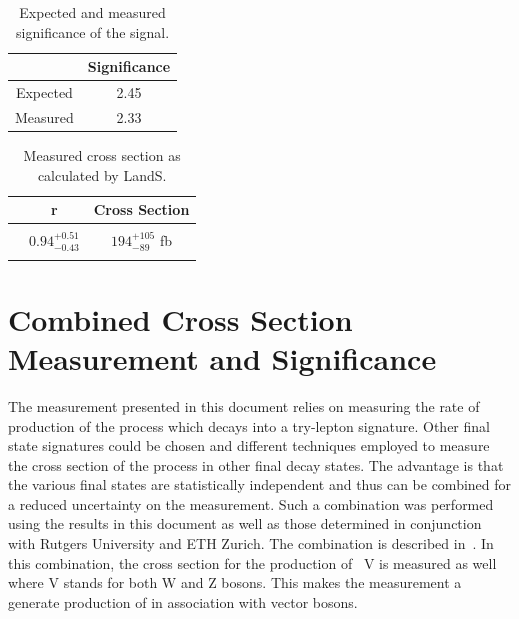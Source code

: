  
 
\begin{table}[ht!]
\begin{center}

\begin{tabular}{c|c}\hline
	& Significance	 \\ \hline
Expected	& 2.45	 \\
Measured	& 2.33	 \\
\hline
\end{tabular}
\caption{ \label{tab:significance} Expected and measured significance of the signal.}
\end{center}
\end{table}
 
\begin{table}[ht!]
\begin{center}

\begin{tabular}{c|cc}\hline
	& r        & Cross Section	 \\ \hline
	&  & \\
\ttZ	& $0.94 _{-0.43} ^{+0.51}$ & 	$194 _{-89} ^{+105}$ fb\\
& & \\
\hline
\end{tabular}
\caption{ \label{tab:landsout} Measured cross section as calculated by LandS.}
\end{center}
\end{table}
 
 
 
 
 
 
 
 \clearpage
 
 
 \section{Combined Cross Section Measurement and Significance}
 The measurement presented in this document relies on measuring the rate of production of the \ttZ process which decays into a try-lepton signature. Other final state signatures could be chosen and different techniques employed to measure the cross section of the \ttZ process in other final decay states. The advantage is that the various final states are statistically independent and thus can be combined for a reduced uncertainty on the measurement. Such a combination was performed using the results in this document as well as those determined in conjunction with Rutgers University and ETH Zurich. The combination is described in~\cite{ttV_combination}. In this combination, the cross section for the production of \ttbar~V is measured as well where V stands for both W and Z bosons. This makes the measurement a generate production of \ttbar in association with vector bosons.\\
 
